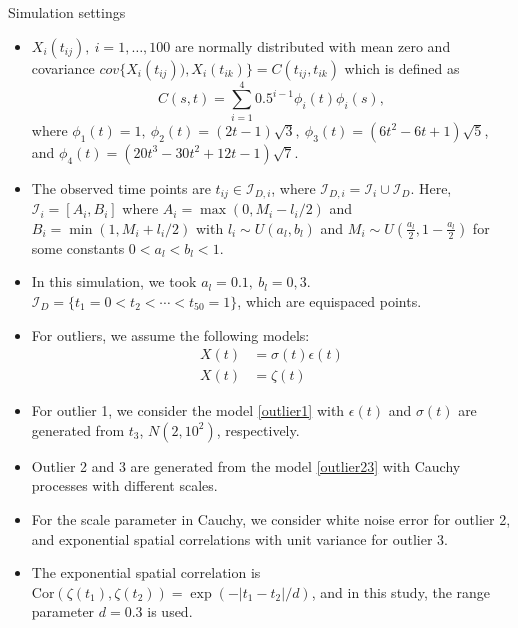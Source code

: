 \documentclass[9pt]{beamer}
\begin{document}
\begin{frame}[allowframebreaks]{Simulation settings}
	\begin{itemize}
		\item{
			$X_i (t_{ij}), ~ i=1, \ldots, 100$ are normally distributed with mean zero and covariance $cov\{ X_{i} (t_{ij}) ) , X_{i} (t_{ik}) \}= C (t_{ij}, t_{ik})$ which is defined as
			$$ C(s,t) = \sum_{i=1}^4 0.5^{i-1} \phi_i (t) \phi_i (s), $$
			where $\phi_1(t) =1 , ~\phi_2(t) = (2t-1) \sqrt{3} , ~ \phi_3(t) = (6t^2-6t+1) \sqrt{5}$, and $\phi_4(t) = (20 t^3 - 30 t^2 +12 t -1) \sqrt{7}$.
		}
		\item{
			The observed time points are $t_{ij} \in \mathcal{I}_{D,i}$, where $  \mathcal{I}_{D,i} = \mathcal{I}_i \cup \mathcal{I}_D$. 
			Here, $ \mathcal{I}_i = [A_i, B_i]$ where $A_i = \max (0, M_i - l_i/2)$ and $B_i = \min (1, M_i + l_i/2)$ with $l_i \sim U(a_l , b_l)$ 
			and $M_i \sim U(\frac{a_l}{2} , 1- \frac{a_l}{2})$ for some constants $0<a_l < b_l<1$.
		}
		\item{
			In this simulation, we took $a_l=0.1, ~b_l = 0,3$.
			$ \mathcal{I}_D = \{ t_1 =0 < t_2 < \cdots < t_{50}=1\}$, which are equispaced points.  
		}
	
		\pagebreak
		\item{
			For outliers, we assume the following models: 
			\begin{align}
			X(t) &= \sigma(t)\epsilon(t) \label{outlier1} \\
			X(t) &= \zeta(t) \label{outlier23}
			\end{align}
		}
		\item{
			For outlier 1, we consider the model \eqref{outlier1} with $\epsilon(t)$ and $\sigma(t)$ are generated from $t_3$, $N(2,10^2)$, respectively.
		}
		\item{
			Outlier 2 and 3 are generated from the model \eqref{outlier23} with Cauchy processes with different scales.
		}
		\item{
			For the scale parameter in Cauchy, we consider white noise error for outlier 2, and exponential spatial correlations with unit variance for outlier 3.
		}
		\item{
			The exponential spatial correlation is $\text{Cor}(\zeta(t_1), \zeta(t_2)) = \exp(-|t_1-t_2|/d)$, and in this study, the range parameter $d=0.3$ is used.
		}
	\end{itemize}



\end{frame}
\end{document}
